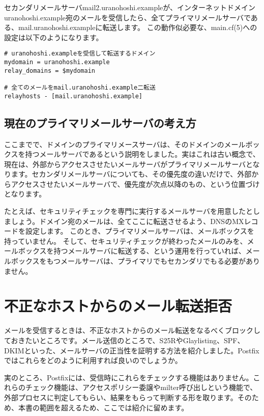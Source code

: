 セカンダリメールサーバmail2.uranohoshi.exampleが、インターネットドメインuranohoshi.example宛のメールを受信したら、全てプライマリメールサーバである、mail.uranohoshi.exampleに転送します。
この動作似必要な、main.cf(5)への設定は以下のようになります。

\begin{lstlisting}[basicstyle=\ttfamily\footnotesize, frame=single]
# uranohoshi.exampleを受信して転送するドメイン
mydomain = uranohoshi.example
relay_domains = $mydomain

# 全てのメールをmail.uranohoshi.example二転送
relayhosts - [mail.uranohoshi.example]
\end{lstlisting}

\subsection{現在のプライマリメールサーバの考え方}

ここまでで、ドメインのプライマリメースサーバは、そのドメインのメールボックスを持つメールサーバであるという説明をしました。実はこれは古い概念で、現在は、外部からアクセスさせたいメールサーバがプライマリメールサーバとなります。セカンダリメールサーバについても、その優先度の違いだけで、外部からアクセスさせたいメールサーバで、優先度が次点以降のもの、という位置づけとなります。

たとえば、セキュリティチェックを専門に実行するメールサーバを用意したとしましょう。ドメイン宛のメールは、全てここに転送させるよう、DNSのMXレコードを設定します。
このとき、プライマリメールサーバは、メールボックスを持っていません。
そして、セキュリティチェックが終わったメールのみを、メールボックスを持つメールサーバに転送する、という運用を行っていれば、メールボックスをもつメールサーバは、プライマリでもセカンダリでもる必要がありません。


\section{不正なホストからのメール転送拒否}

メールを受信するときは、不正なホストからのメール転送をなるべくブロックしておきたいところです。メール送信のところで、S25RやGlaylisting、SPF、DKIMといった、メールサーバの正当性を証明する方法を紹介しました。Postfixではこれらをどのように利用すれば良いのでしょうか。

実のところ、Postfixには、受信時にこれらをチェックする機能はありません。これらのチェック機能は、アクセスポリシー委譲やmilter呼び出しという機能で、外部プロセスに判定してもらい、結果をもらって判断する形を取ります。そのため、本書の範囲を超えるため、ここでは紹介に留めます。

